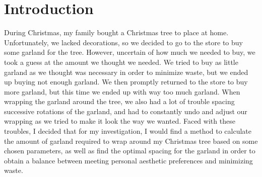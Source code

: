 \section{Introduction}
During Christmas, my family bought a Christmas tree to place at home. Unfortunately, we lacked decorations, so we decided to go to the store to buy some garland for the tree. However, uncertain of how much we needed to buy, we took a guess at the amount we thought we needed. We tried to buy as little garland as we thought was necessary in order to minimize waste, but we ended up buying not enough garland. We then promptly returned to the store to buy more garland, but this time we ended up with way too much garland. When wrapping the garland around the tree, we also had a lot of trouble spacing successive rotations of the garland, and had to constantly undo and adjust our wrapping as we tried to make it look the way we wanted. Faced with these troubles, I decided that for my investigation, I would find a method to calculate the amount of garland required to wrap around my Christmas tree based on some chosen parameters, as well as find the optimal spacing for the garland in order to obtain a balance between meeting personal aesthetic preferences and minimizing waste.
